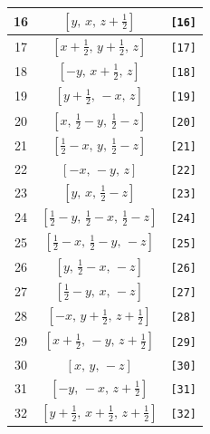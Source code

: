\documentclass[fleqn,8pt]{jsarticle}
\begin{document}
\begin{longtable}{ccc}
16 & $\left[ y,\, x,\, z + \frac{1}{2} \right]$ & {\tt [16]} \\ \hline
17 & $\left[ x + \frac{1}{2},\, y + \frac{1}{2},\, z \right]$ & {\tt [17]} \\ \hline
18 & $\left[ - y,\, x + \frac{1}{2},\, z \right]$ & {\tt [18]} \\ \hline
19 & $\left[ y + \frac{1}{2},\, - x,\, z \right]$ & {\tt [19]} \\ \hline
20 & $\left[ x,\, \frac{1}{2} - y,\, \frac{1}{2} - z \right]$ & {\tt [20]} \\ \hline
21 & $\left[ \frac{1}{2} - x,\, y,\, \frac{1}{2} - z \right]$ & {\tt [21]} \\ \hline
22 & $\left[ - x,\, - y,\, z \right]$ & {\tt [22]} \\ \hline
23 & $\left[ y,\, x,\, \frac{1}{2} - z \right]$ & {\tt [23]} \\ \hline
24 & $\left[ \frac{1}{2} - y,\, \frac{1}{2} - x,\, \frac{1}{2} - z \right]$ & {\tt [24]} \\ \hline
25 & $\left[ \frac{1}{2} - x,\, \frac{1}{2} - y,\, - z \right]$ & {\tt [25]} \\ \hline
26 & $\left[ y,\, \frac{1}{2} - x,\, - z \right]$ & {\tt [26]} \\ \hline
27 & $\left[ \frac{1}{2} - y,\, x,\, - z \right]$ & {\tt [27]} \\ \hline
28 & $\left[ - x,\, y + \frac{1}{2},\, z + \frac{1}{2} \right]$ & {\tt [28]} \\ \hline
29 & $\left[ x + \frac{1}{2},\, - y,\, z + \frac{1}{2} \right]$ & {\tt [29]} \\ \hline
30 & $\left[ x,\, y,\, - z \right]$ & {\tt [30]} \\ \hline
31 & $\left[ - y,\, - x,\, z + \frac{1}{2} \right]$ & {\tt [31]} \\ \hline
32 & $\left[ y + \frac{1}{2},\, x + \frac{1}{2},\, z + \frac{1}{2} \right]$ & {\tt [32]} \\
\end{longtable}
\end{document}
